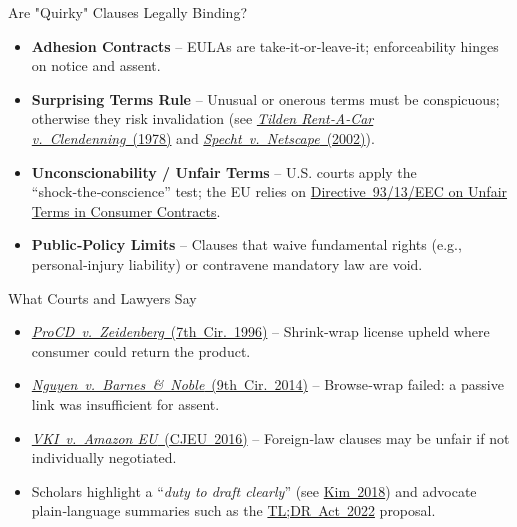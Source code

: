 \begin{frame}{Are "Quirky" Clauses Legally Binding?}
  \begin{itemize}
    \item \textbf{Adhesion Contracts} – EULAs are take‑it‑or‑leave‑it; enforceability hinges on notice and assent.
    \item \textbf{Surprising Terms Rule} – Unusual or onerous terms must be conspicuous; otherwise they risk invalidation (see \href{https://en.wikipedia.org/wiki/Tilden_Rent-A-Car_Co_v_Clendenning}{\textit{Tilden Rent‑A‑Car v. Clendenning} (1978)} and \href{https://law.justia.com/cases/federal/appellate-courts/F3/306/17/59077/}{\textit{Specht v. Netscape} (2002)}).
    \item \textbf{Unconscionability / Unfair Terms} – U.S. courts apply the “shock‑the‑conscience” test; the EU relies on \href{https://eur-lex.europa.eu/legal-content/EN/TXT/?uri=CELEX:31993L0013}{Directive 93/13/EEC on Unfair Terms in Consumer Contracts}.
    \item \textbf{Public‑Policy Limits} – Clauses that waive fundamental rights (e.g., personal‑injury liability) or contravene mandatory law are void.
  \end{itemize}
\end{frame}

\begin{frame}{What Courts and Lawyers Say}
  \small
  \begin{itemize}
    \item \href{https://law.justia.com/cases/federal/appellate-courts/F3/86/1447/512628/}{\textit{ProCD v. Zeidenberg} (7th Cir. 1996)} – Shrink‑wrap license upheld where consumer could return the product.
    \item \href{https://law.justia.com/cases/federal/appellate-courts/F3/763/1171/178520/}{\textit{Nguyen v. Barnes \& Noble} (9th Cir. 2014)} – Browse‑wrap failed: a passive link was insufficient for assent.
    \item \href{https://eur-lex.europa.eu/legal-content/EN/TXT/?uri=CELEX:62015CJ0191}{\textit{VKI v. Amazon EU} (CJEU 2016)} – Foreign‑law clauses may be unfair if not individually negotiated.
    \item Scholars highlight a “\textit{duty to draft clearly}” (see \href{https://global.oup.com/academic/product/wrap-contracts-9780199336757}{Kim 2018}) and advocate plain‑language summaries such as the \href{https://www.engadget.com/2022-01-10-tldr-act-terms-of-service-plain-language.html}{TL;DR Act 2022} proposal.
  \end{itemize}
\end{frame}

